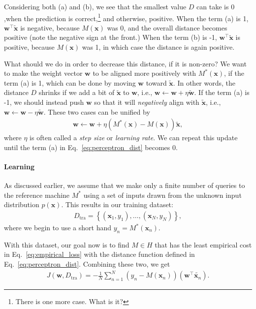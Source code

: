 \documentclass{report}
\newcommand{\vect}[1]{\mathbf{#1}}
\newcommand{\vx}[0]{\vect{x}}
\newcommand{\vw}[0]{\vect{w}}
\begin{document}
Considering both (a) and (b), we see that the smallest value $D$ can take is $0$
,when the prediction is correct,\footnote{
    There is one more case. What is it?
} and otherwise, positive. When the term (a) is 1, $\vw^\top \tilde{\vx}$ is
negative, because $M(\vx)$ was 0, and the overall distance becomes positive
(note the negative sign at the front.) When the term (b) is -1, $\vw^\top
\tilde{\vx}$ is positive, because $M(\vx)$ was 1, in which case the distance is
again positive. 

What should we do in order to decrease this distance, if it is non-zero? We want
to make the weight vector $\vw$ to be aligned more positively with $M^*(\vx)$,
if the term (a) is 1, which can be done by moving $\vw$ toward $\tilde{\vx}$. In
other words, the distance $D$ shrinks if we add a bit of $\tilde{\vx}$ to $\vw$,
i.e., $\vw \leftarrow \vw + \eta \tilde{\vw}$. If the term (a) is -1, we should
instead push $\vw$ so that it will {\it negatively} align with $\tilde{\vx}$,
i.e., $\vw \leftarrow \vw - \eta \tilde{\vw}$. These two cases can be unified by
\begin{align}
    \label{eq:perceptron_rule0}
    \vw \leftarrow \vw + \eta \left( M^*(\vx) - M(\vx)\right) \tilde{\vx},
\end{align}
where $\eta$ is often called a {\it step size} or {\it learning rate}.  We can
repeat this update until the term (a) in Eq.~\eqref{eq:perceptron_dist} becomes
0. 

\paragraph{Learning}

As discussed earlier, we assume that we make only a finite number of queries to
the reference machine $M^*$ using a set of inputs drawn from the unknown input
distribution $p(\vx)$. This results in our training dataset:
\begin{align*}
    D_{\text{tra}} = \left\{ (\vx_1, y_1), \ldots, (\vx_N, y_N) \right\},
\end{align*}
where we begin to use a short hand $y_n=M^*(\vx_n)$.

With this dataset, our goal now is to find $M \in H$ that has the least
empirical cost in Eq.~\eqref{eq:empirical_loss} with the distance function
defined in Eq.~\eqref{eq:perceptron_dist}. Combining these two, we get
\begin{align}
    \label{eq:perceptron_cost}
    J(\vw, D_{\text{tra}}) = -\frac{1}{N} \sum_{n=1}^N 
    \left( y_n - M(\vx_n) \right) 
    \left(\vw^\top \tilde{\vx_n}\right).
\end{align}
\end{document}
